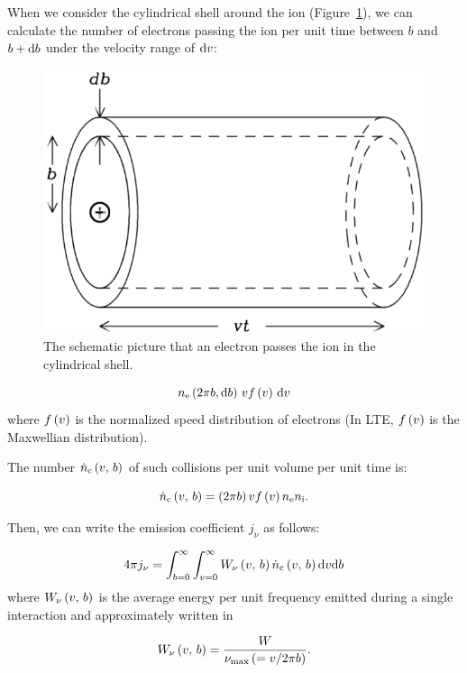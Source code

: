 When we consider the cylindrical shell around the ion (Figure~\ref{fig:nrao_radio4n5}), we can calculate the number of electrons passing the ion per unit time between $b$ and $b + \mathrm{d} b$ under the velocity range of $\mathrm{d} v$:

\begin{figure}[htbp]
	\centering
	\includegraphics[width=.6\linewidth]{Chapter_2/Figures/NRAO_radio4n5.png}
    \caption[The schematic picture of the cylindrical shell of electrons]{\label{fig:nrao_radio4n5}
        The schematic picture that an electron passes the ion in the cylindrical shell.
    }
\end{figure}

\begin{equation}\label{eq:essential_radio4n27}
    n_{\mathrm{e}} \left(2\pi b,\mathrm{d} b\right)\,v f\left(v\right)\,\mathrm{d} v
\end{equation}
where $f\left(v\right)$ is the normalized speed distribution of electrons (In LTE, $f\left(v\right)$ is the Maxwellian distribution).

The number $\dot{n}_{\mathrm{c}}\left(v,\,b\right)$ of such collisions per unit volume per unit time is:

\begin{equation}\label{eq:essential_radio4n28}
    \dot{n}_{\mathrm{c}}\left(v,\,b\right) = \left(2\pi b\right) v f\left(v\right) n_{\mathrm{e}} n_{\mathrm{i}}.
\end{equation}

Then, we can write the emission coefficient $j_{\nu}$ as follows:

\begin{equation}\label{eq:essential_radio4n29}
    4 \pi j_{\nu}=\int_{b=0}^{\infty} \int_{v=0}^{\infty} W_{\nu}\left(v,\,b\right) \dot{n}_{\mathrm{c}}\left(v,\,b\right) \mathrm{d} v \mathrm{d} b
\end{equation}
where $W_{\mathrm{\nu}}\left(v,\,b\right)$ is the average energy per unit frequency emitted during a single interaction and approximately written in

\begin{equation}\label{eq:maximum_frequency}
    W_{\mathrm{\nu}}\left(v,\,b\right) = \frac{W}{\nu_{\mathrm{\max}} \left(= v/2\pi b\right)}.
\end{equation}

